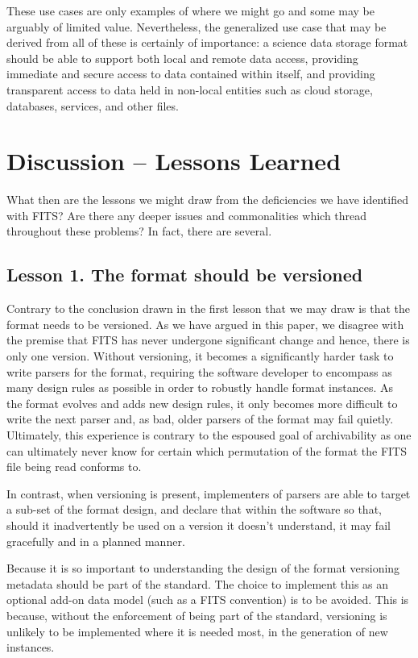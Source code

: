 \documentclass[final,authoryear,5p,times,twocolumn]{elsarticle}
\begin{document}
{{These use cases are only examples of where we might go and some may be
arguably of limited value. Nevertheless, the generalized use case that
may be derived from all of these is certainly of importance:
a science data storage format should be able to support both local 
and remote data access, providing immediate and secure access to data 
contained within itself, and providing transparent access to data held 
in non-local entities such as cloud storage, databases, services, and 
other files.


\section{Discussion -- Lessons Learned}

What then are the lessons we might draw from the deficiencies
we have identified with FITS? Are there any deeper issues and 
commonalities which thread throughout these problems? In fact,
there are several.


\subsection{Lesson 1. The format should be versioned}
Contrary to the conclusion drawn in \citet{1997ASPC..125..257W} 
the first lesson that we may draw is that the format needs to be
versioned. 
As we have argued in this paper, we disagree with the premise 
that FITS has never undergone significant change and hence, there
is only one version. Without versioning, it becomes a significantly 
harder task to write parsers for the format, requiring the software
developer to encompass as many design rules as possible in order
to robustly handle format instances. As the format evolves and
adds new design rules, it only becomes more difficult to write the
next parser and, as bad, older parsers of the format may fail quietly.
Ultimately, this experience is contrary to the espoused goal of 
archivability as one can ultimately never know for certain which 
permutation of the format the FITS file being read conforms to.


In contrast, when versioning is present, implementers of parsers
are able to target a sub-set of the format design, and declare
that within the software so that, should it inadvertently be used
on a version it doesn't understand, it may fail gracefully and
in a planned manner.


Because it is so important to understanding the design of
the format versioning metadata should be part of the standard.
The choice to implement this as an optional add-on data model
(such as a FITS convention) is to be avoided. This is because,
without the enforcement of being part of the standard, versioning
is unlikely to be implemented where it is needed most, in the
generation of new instances.


}}
\end{document}
